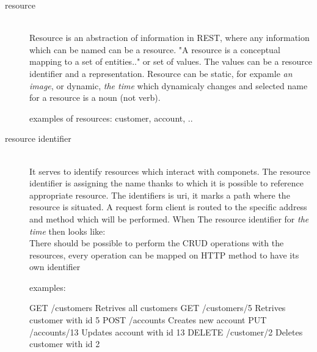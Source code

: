 \begin{description}
  \item [resource] \hfill \\ 
  Resource is an abstraction of information in REST, where any information which can be named can be a resource. "A resource is a conceptual mapping to a set of entities.." \cite{fielding} or set of values. The values can be a resource identifier and a representation.
  Resource can be static, for expamle \emph{an image}, or dynamic, \emph{the time} which dynamicaly changes and selected name for a resource is a noun (not verb).
  
  examples of resources: customer, account, ..

  \item [resource identifier] \hfill \\
  It serves to identify resources which interact with componets. The resource identifier is assigning the name thanks to which it is possible to reference appropriate resource. The identifiers is \gls{uri}, it marks a path where the resource is situated. A request form client is routed to the specific address and method which will be performed. When 
  The resource identifier for \emph{the time} then looks like: \hfill \\
There should be possible to perform the CRUD operations with the resources, every operation can be mapped on HTTP method to have its own identifier

examples:

GET     /customers      Retrives all customers
GET     /customers/5    Retrives customer with id 5
POST    /accounts       Creates new account
PUT     /accounts/13    Updates account with id 13
DELETE  /customer/2     Deletes customer with id 2   


\end{description}

